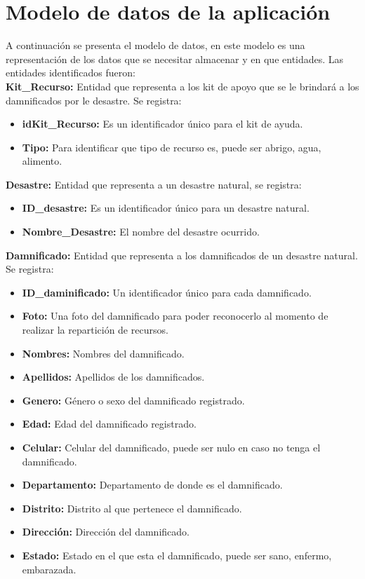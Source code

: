 \documentclass[11pt,openany]{book}
\begin{document}
	\section{Modelo de datos de la aplicación}
	A continuación se presenta el modelo de datos, en este modelo es una representación de los datos que se necesitar almacenar y en que entidades. Las entidades identificados fueron:\\[0.25cm]
	\textbf{Kit\_Recurso: }Entidad que representa a los kit de apoyo que se le brindará a los damnificados por le desastre. Se registra:
	\begin{itemize}
		\item \textbf{idKit\_Recurso: }Es un identificador único para el kit de ayuda.
		\item \textbf{Tipo: }Para identificar que tipo de recurso es, puede ser abrigo, agua, alimento.
	\end{itemize}
	\textbf{Desastre: }Entidad que representa a un desastre natural, se registra:
	\begin{itemize}
		\item \textbf{ID\_desastre: }Es un identificador único para un desastre natural.
		\item \textbf{Nombre\_Desastre: }El nombre del desastre ocurrido. 
	\end{itemize}
	\textbf{Damnificado: }Entidad que representa a los damnificados de un desastre natural. Se registra:
	\begin{itemize} 
		\item \textbf{ID\_daminificado: }Un identificador único para cada damnificado.
		\item \textbf{Foto: }Una foto del damnificado para poder reconocerlo al momento de realizar la repartición de recursos.
		\item \textbf{Nombres: }Nombres del damnificado.
		\item \textbf{Apellidos: }Apellidos de los damnificados.
		\item \textbf{Genero: }Género o sexo del damnificado registrado.
		\item \textbf{Edad: }Edad del damnificado registrado.
		\item \textbf{Celular: }Celular del damnificado, puede ser nulo en caso no tenga el damnificado.
		\item \textbf{Departamento: }Departamento de donde es el damnificado.
		\item \textbf{Distrito: }Distrito al que pertenece el damnificado.
		\item \textbf{Dirección: }Dirección del damnificado.
		\item \textbf{Estado: }Estado en el que esta el damnificado, puede ser sano, enfermo, embarazada.
	\end{itemize}
\end{document}
